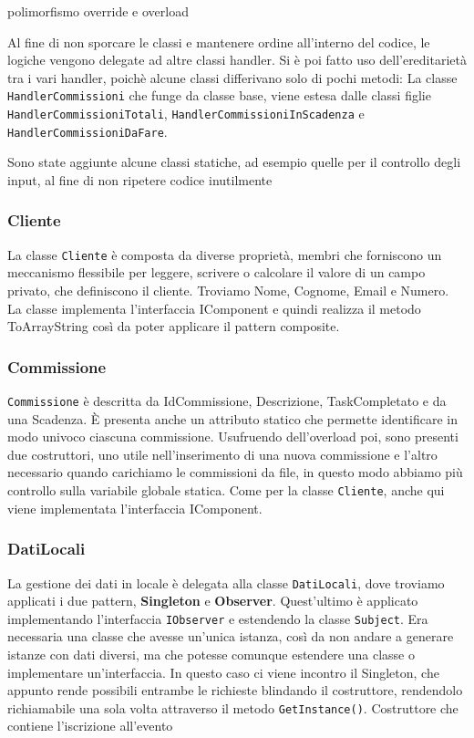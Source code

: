  \vspace{0.5cm}
 polimorfismo
 \vspace{0.5cm}
 override e overload
 \vspace{0.5cm}



Al fine di non sporcare le classi e mantenere ordine all'interno del codice, le logiche vengono delegate ad altre classi handler.
Si è poi fatto uso dell'ereditarietà tra i vari handler, poichè alcune classi differivano solo di pochi metodi: 
La classe \texttt{HandlerCommissioni} che funge da classe base, viene estesa dalle classi figlie \texttt{HandlerCommissioniTotali},
\texttt{HandlerCommissioniInScadenza} e \texttt{HandlerCommissioniDaFare}.

Sono state aggiunte alcune classi statiche, ad esempio quelle per il controllo degli input, al fine di non ripetere codice
inutilmente

\subsubsection{Cliente}
La classe \texttt{Cliente} è composta da diverse proprietà, membri che forniscono un meccanismo flessibile per leggere, 
scrivere o calcolare il valore di un campo privato, che definiscono il cliente. Troviamo Nome, Cognome, Email e Numero. \\
La classe implementa l'interfaccia IComponent e quindi realizza il metodo ToArrayString così da poter applicare il pattern
composite.

\subsubsection{Commissione}
\texttt{Commissione} è descritta da IdCommissione, Descrizione, TaskCompletato e da una Scadenza. È presenta anche un attributo
statico che permette identificare in modo univoco ciascuna commissione. Usufruendo dell'overload poi, sono presenti due costruttori,
uno utile nell'inserimento di una nuova commissione e l'altro necessario quando carichiamo le commissioni da file, in questo modo
abbiamo più controllo sulla variabile globale statica. Come per la classe \texttt{Cliente}, anche qui viene implementata l'interfaccia
IComponent.

\subsubsection{DatiLocali}
La gestione dei dati in locale è delegata alla classe \texttt{DatiLocali}, dove troviamo applicati i due pattern, \textbf{Singleton} e 
\textbf{Observer}. Quest'ultimo è applicato implementando l'interfaccia \texttt{IObserver} e estendendo la classe \texttt{Subject}.
Era necessaria una classe che avesse un'unica istanza, così da non andare a generare istanze con dati diversi, ma che potesse comunque 
estendere una classe o implementare un'interfaccia. In questo caso ci viene incontro il Singleton, che appunto rende possibili entrambe le richieste blindando il costruttore, 
rendendolo richiamabile una sola volta attraverso il metodo \texttt{GetInstance()}. Costruttore che contiene l'iscrizione all'evento




